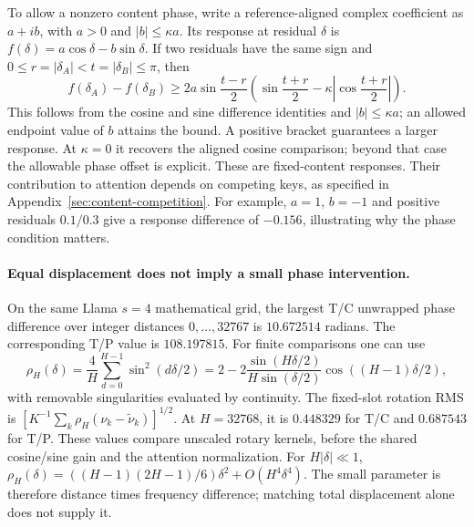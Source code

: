 To allow a nonzero content phase, write a reference-aligned complex
coefficient as $a+ib$, with $a>0$ and $|b|\le\kappa a$. Its response at residual
$\delta$ is $f(\delta)=a\cos\delta-b\sin\delta$. If two residuals have the
same sign and $0\le r=|\delta_A|<t=|\delta_B|\le\pi$, then
\begin{equation}
f(\delta_A)-f(\delta_B)\ge
2a\sin\frac{t-r}{2}
\left(\sin\frac{t+r}{2}-\kappa\left|\cos\frac{t+r}{2}\right|\right).
\label{eq:finite-coherent-response}
\end{equation}
This follows from the cosine and sine difference identities and
$|b|\le\kappa a$; an allowed endpoint value of $b$ attains the bound.
A positive bracket guarantees a larger response. At $\kappa=0$ it recovers
the aligned cosine comparison; beyond that case the allowable phase offset
is explicit. These are fixed-content responses. Their contribution to
attention depends on competing keys, as specified in
Appendix~\ref{sec:content-competition}. For example, $a=1$, $b=-1$ and
positive residuals $0.1/0.3$ give a response difference of $-0.156$,
illustrating why the phase condition matters.

\paragraph{Equal displacement does not imply a small phase intervention.}
On the same Llama $s=4$ mathematical grid, the largest T/C unwrapped
phase difference over integer distances $0,\ldots,32767$ is
$10.672514$ radians. The corresponding T/P value is $108.197815$.
For finite comparisons one can use
\begin{equation}
\rho_H(\delta)=\frac4H\sum_{d=0}^{H-1}\sin^2(d\delta/2)
=2-2\frac{\sin(H\delta/2)}{H\sin(\delta/2)}
\cos((H-1)\delta/2),
\label{eq:allocation-finite-phase-cost}
\end{equation}
with removable singularities evaluated by continuity. The fixed-slot
rotation RMS is $[K^{-1}\sum_k\rho_H(\nu_k-\widetilde\nu_k)]^{1/2}$.
At $H=32768$, it is $0.448329$ for T/C and $0.687543$ for T/P.
These values compare unscaled rotary kernels, before the shared
cosine/sine gain and the attention normalization.
For $H|\delta|\ll1$,
$\rho_H(\delta)=((H-1)(2H-1)/6)\delta^2+O(H^4\delta^4)$.
The small parameter is therefore distance times frequency difference;
matching total displacement alone does not supply it.

